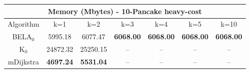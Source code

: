 \begin{tabular}{c|cccccc}\toprule
\multicolumn{7}{c}{Memory (Mbytes) - 10-Pancake heavy-cost}\\ \midrule
Algorithm & k=1 & k=2 & k=3 & k=4 & k=5 & k=10 \\ \midrule
BELA$_0$ & 5995.18 & 6077.47 & \textbf{6068.00} & \textbf{6068.00} & \textbf{6068.00} & \textbf{6068.00} \\
K$_0$ & 24872.32 & 25250.15 & -- & -- & -- & -- \\
mDijkstra & \textbf{4697.24} & \textbf{5531.04} & -- & -- & -- & -- \\ \bottomrule 
\end{tabular}
